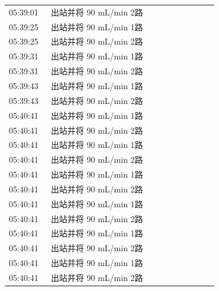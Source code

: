 \documentclass[UTF8,10pt,a4paper,fontset=fandol]{ctexart}
\begin{document}
\begin{tabular}{p{0.18\linewidth}p{0.72\linewidth}}
05:39:01 & 出站并将 90 mL/min 2路\\
05:39:25 & 出站并将 90 mL/min 1路\\
05:39:25 & 出站并将 90 mL/min 2路\\
05:39:31 & 出站并将 90 mL/min 1路\\
05:39:31 & 出站并将 90 mL/min 2路\\
05:39:43 & 出站并将 90 mL/min 1路\\
05:39:43 & 出站并将 90 mL/min 2路\\
05:40:41 & 出站并将 90 mL/min 1路\\
05:40:41 & 出站并将 90 mL/min 2路\\
05:40:41 & 出站并将 90 mL/min 1路\\
05:40:41 & 出站并将 90 mL/min 2路\\
05:40:41 & 出站并将 90 mL/min 1路\\
05:40:41 & 出站并将 90 mL/min 2路\\
05:40:41 & 出站并将 90 mL/min 1路\\
05:40:41 & 出站并将 90 mL/min 2路\\
05:40:41 & 出站并将 90 mL/min 1路\\
05:40:41 & 出站并将 90 mL/min 2路\\
05:40:41 & 出站并将 90 mL/min 1路\\
05:40:41 & 出站并将 90 mL/min 2路\\
\end{tabular}


\newpage
\end{document}
